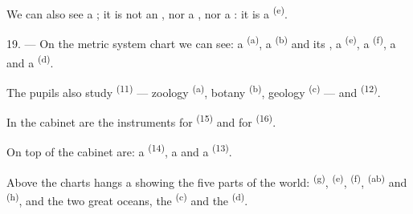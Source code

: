 We can also see a ; it is not an , nor a
, nor a : it is a 
\textsuperscript{(e)}.

19. --- On the metric system chart we can see: a  \textsuperscript{(a)}, a
 \textsuperscript{(b)} and its , a
 \textsuperscript{(e)}, a  \textsuperscript{(f)}, a 
and a  \textsuperscript{(d)}.

The pupils also study  \textsuperscript{(11)} --- zoology
\textsuperscript{(a)}, botany \textsuperscript{(b)}, geology \textsuperscript{(c)} --- and
 \textsuperscript{(12)}.

In the cabinet are the instruments for  \textsuperscript{(15)} and for
 \textsuperscript{(16)}.

On top of the cabinet are: a  \textsuperscript{(14)}, a  and a
 \textsuperscript{(13)}.

Above the charts hangs a  showing the five parts of the world:
 \textsuperscript{(g)},  \textsuperscript{(e)}, 
\textsuperscript{(f)},  \textsuperscript{(ab)} and 
\textsuperscript{(h)}, and the two great oceans, the  \textsuperscript{(c)}
and the  \textsuperscript{(d)}.
\VUsaut{6.0mm}
\VUfilet{22mm}
